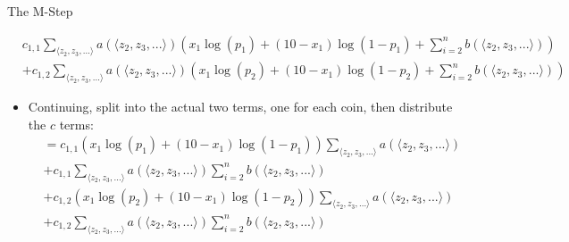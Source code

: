 \documentclass[aspectratio=169]{beamer}
\begin{document}
\begin{frame}{The M-Step}

{\footnotesize
		\begin{align}
		&c_{1, 1} \sum_{\langle z_2, z_3, ... \rangle} a(\langle z_2, z_3, ... \rangle) 
			\left(x_1\log (p_1) + (10 - x_1) \log (1 - p_1) + \sum_{i = 2}^n b (\langle z_2, z_3, ... \rangle) \right) 
\nonumber \\
		&+ c_{1, 2} \sum_{\langle z_2, z_3, ... \rangle} a(\langle z_2, z_3, ... \rangle) 
			\left(x_1\log (p_2) + (10 - x_1) \log (1 - p_2) + \sum_{i = 2}^n b (\langle z_2, z_3, ... \rangle) \right) 
\nonumber 
		\end{align}
	\begin{itemize}
	\item Continuing, split into the actual two terms, one for each coin, then distribute the $c$ terms:
		\begin{align}
		&= c_{1, 1} \left(x_1\log (p_1) + (10 - x_1) \log (1 - p_1) \right) \sum_{\langle z_2, z_3, ... \rangle} a(\langle z_2, z_3, ... \rangle) 
\nonumber \\
		&+ c_{1, 1} \sum_{\langle z_2, z_3, ... \rangle} a(\langle z_2, z_3, ... \rangle) \sum_{i = 2}^n b (\langle z_2, z_3, ... \rangle)  
\nonumber \\
		&+ c_{1, 2} \left(x_1\log (p_2) + (10 - x_1) \log (1 - p_2) \right) \sum_{\langle z_2, z_3, ... \rangle} a(\langle z_2, z_3, ... \rangle) 
\nonumber \\
		&+ c_{1, 2} \sum_{\langle z_2, z_3, ... \rangle} a(\langle z_2, z_3, ... \rangle) \sum_{i = 2}^n b (\langle z_2, z_3, ... \rangle)  
\nonumber 
		\end{align}
	\end{itemize}
	}
	\end{frame}
\end{document}
